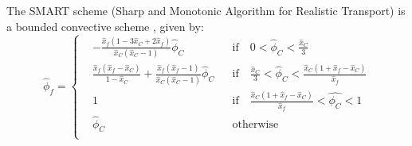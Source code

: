 The SMART scheme (Sharp and Monotonic Algorithm for Realistic Transport) is a
bounded convective scheme \cite{gaskell1988curvature}, given by:
\begin{equation} \label{eq:smart_scheme}
	\hat{\phi}_f = 
	\left\{
	\begin{aligned}
		&-\frac{\hat{x}_f (1 - 3 \hat{x}_C + 2 \hat{x}_f)}{\hat{x}_C (\hat{x}_C - 1)} \hat{\phi}_C & 
		&\text{if} \quad 0 < \hat{\phi}_C < \frac{\hat{x}_C}{3} \\
		&\frac{\hat{x}_f (\hat{x}_f - \hat{x}_C)}{1 - \hat{x}_C} + \frac{\hat{x}_f (\hat{x}_f - 1)}{\hat{x}_C (\hat{x}_C - 1)} \hat{\phi}_C &
		&\text{if} \quad \frac{\hat{x}_C}{3} < \hat{\phi}_C <  \frac{\hat{x}_C (1 + \hat{x}_f - \hat{x}_C)}{\hat{x}_f} \\
		&1 & &\text{if} \quad \frac{\hat{x}_C (1 + \hat{x}_f - \hat{x}_C)}{\hat{x}_f} < \hat{\phi_C} < 1 \\
		&\hat{\phi}_C & &\text{otherwise} \\
	\end{aligned}
	\right.
\end{equation}